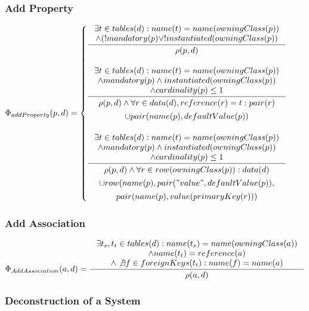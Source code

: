 \documentclass[11pt]{article}
\begin{document}
\subsubsection{Add Property}
$
\Phi_{addProperty}(p, d) = \begin{cases}
\inference{ \exists t \in tables(d) : name(t) = name(owningClass(p)) \\ \wedge (! mandatory(p) \vee ! instantiated(owningClass(p))}{ \rho(p,d)} 
\\ \\ 
\inference{ \exists t \in tables(d) : name(t) = name(owningClass(p)) \\ \wedge mandatory(p) \wedge instantiated(owningClass(p)) \\ \wedge cardinality(p) \leq 1}{\begin{gathered}
 \rho(p,d) \wedge \forall r \in data(d), reference(r) = t : pair(r) \\ \cup pair(name(p), defaultValue(p))
\end{gathered}
} 
\\ \\
\inference{ \exists t \in tables(d) : name(t) = name(owningClass(p)) \\ \wedge mandatory(p) \wedge instantiated(owningClass(p)) \\ \wedge cardinality(p) \leq 1}{\begin{gathered}
 \rho(p,d) \wedge \forall r \in row(owningClass(p)) : data(d)\\ \cup row(name(p), pair("value", defaultValue(p)), \\ pair(name(p), value(primaryKey(r))) 
\end{gathered}
} 

\end{cases}
$

\subsubsection{Add Association}
$
\Phi_{AddAssociation}(a, d) = \inference{ \exists t_s, t_t \in tables(d) : name(t_s) = name(owningClass(a)) \\ \wedge name(t_t) = reference(a) \\ \wedge \not \exists f \in foreignKeys(t_t) : name(f) = name(a) }{ \rho(a,d)}
$


\subsubsection{Deconstruction of a System}
\end{document}
